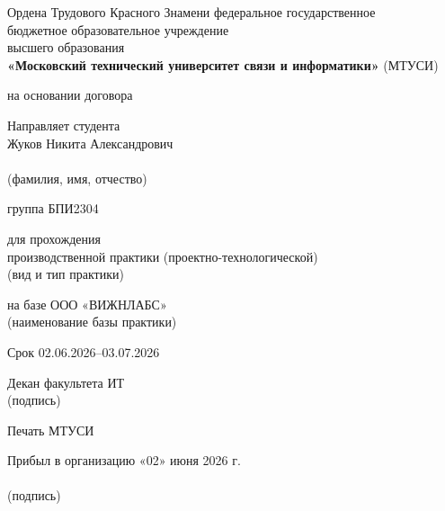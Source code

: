 \documentclass[12pt,a4paper]{report}
\begin{document}
\begin{center}
\parbox{0.9\textwidth}{\centering\small
Ордена Трудового Красного Знамени федеральное государственное \\
бюджетное образовательное учреждение \\
высшего образования \\
\textbf{«Московский технический университет связи и информатики»} (МТУСИ)
}
\end{center}

\vspace{1em}

на основании договора \hrulefill

\vspace{1em}

Направляет студента \hrulefill \\
Жуков Никита Александрович \\
\makebox[\linewidth]{\hrulefill} \\
(фамилия, имя, отчество)

группа БПИ2304 \hrulefill

\vspace{1em}

для прохождения \\
производственной практики (проектно-технологической) \hrulefill \\
(вид и тип практики)

на базе ООО «ВИЖНЛАБС» \hrulefill \\
(наименование базы практики)

Срок 02.06.2026–03.07.2026 \hrulefill

\vspace{3em}

\hfill\begin{minipage}{0.5\textwidth}
\raggedleft
Декан факультета ИТ \hrulefill \\
\hspace{2em} (подпись)
\end{minipage}

\vspace{1em}

Печать МТУСИ

\vspace{3em}

Прибыл в организацию «02» июня 2026 г. \\
\hrulefill \\
(подпись)

\vspace{1em}
\end{document}
